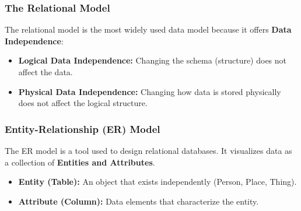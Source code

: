 \documentclass{article}
\begin{document}
\subsubsection{The Relational Model}
The relational model is the most widely used data model because it offers \textbf{Data Independence}:
\begin{itemize}
    \item \textbf{Logical Data Independence:} Changing the schema (structure) does not affect the data.
    \item \textbf{Physical Data Independence:} Changing how data is stored physically does not affect the logical structure.
\end{itemize}

\subsubsection{Entity-Relationship (ER) Model}
The ER model is a tool used to design relational databases. It visualizes data as a collection of \textbf{Entities and Attributes}.

\begin{itemize}
    \item \textbf{Entity (Table):} An object that exists independently (Person, Place, Thing). 
    \item \textbf{Attribute (Column):} Data elements that characterize the entity.
\end{itemize}

\begin{center}
\end{center}
\end{document}

